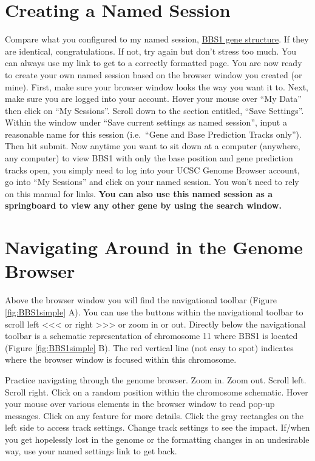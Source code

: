 \documentclass[
]{book}
\begin{document}
\hypertarget{creating-a-named-session}{%
\section{Creating a Named Session}\label{creating-a-named-session}}

Compare what you configured to my named session, \href{https://genome.ucsc.edu/s/megallegos/Biol\%20310\%20Module\%201}{BBS1 gene structure}. If they are identical, congratulations. If not, try again but don't stress too much. You can always use my link to get to a correctly formatted page. You are now ready to create your own named session based on the browser window you created (or mine). First, make sure your browser window looks the way you want it to. Next, make sure you are logged into your account. Hover your mouse over ``My Data'' then click on ``My Sessions''. Scroll down to the section entitled, ``Save Settings''. Within the window under ``Save current settings as named session'', input a reasonable name for this session (i.e.~``Gene and Base Prediction Tracks only''). Then hit submit. Now anytime you want to sit down at a computer (anywhere, any computer) to view BBS1 with only the base position and gene prediction tracks open, you simply need to log into your UCSC Genome Browser account, go into ``My Sessions'' and click on your named session. You won't need to rely on this manual for links. \textbf{You can also use this named session as a springboard to view any other gene by using the search window.}

\hypertarget{navigating-around-in-the-genome-browser}{%
\section{Navigating Around in the Genome Browser}\label{navigating-around-in-the-genome-browser}}

Above the browser window you will find the navigational toolbar (Figure \ref{fig:BBS1simple} A). You can use the buttons within the navigational toolbar to scroll left \textless\textless\textless{} or right \textgreater\textgreater\textgreater{} or zoom in or out. Directly below the navigational toolbar is a schematic representation of chromosome 11 where BBS1 is located (Figure \ref{fig:BBS1simple} B). The red vertical line (not easy to spot) indicates where the browser window is focused within this chromosome.

Practice navigating through the genome browser. Zoom in. Zoom out. Scroll left. Scroll right. Click on a random position within the chromosome schematic. Hover your mouse over various elements in the browser window to read pop-up messages. Click on any feature for more details. Click the gray rectangles on the left side to access track settings. Change track settings to see the impact. If/when you get hopelessly lost in the genome or the formatting changes in an undesirable way, use your named settings link to get back.
\end{document}
